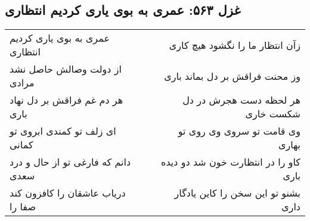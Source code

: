 \begin{center}
\section*{غزل ۵۶۳: عمری به بوی یاری کردیم انتظاری}
\label{sec:563}
\begin{longtable}{l p{0.5cm} r}
عمری به بوی یاری کردیم انتظاری
&&
زآن انتظار ما را نگشود هیچ کاری
\\
از دولت وصالش حاصل نشد مرادی
&&
وز محنت فراقش بر دل بماند باری
\\
هر دم غم فراقش بر دل نهاد باری
&&
هر لحظه دست هجرش در دل شکست خاری
\\
ای زلف تو کمندی ابروی تو کمانی
&&
وی قامت تو سروی وی روی تو بهاری
\\
دانم که فارغی تو از حال و درد سعدی
&&
کاو را در انتظارت خون شد دو دیده باری
\\
دریاب عاشقان را کافزون کند صفا را
&&
بشنو تو این سخن را کاین یادگار داری
\\
\end{longtable}
\end{center}
